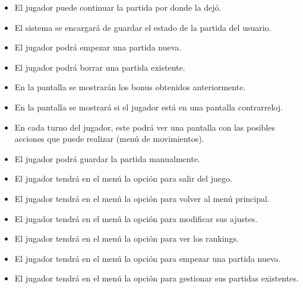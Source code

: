 \begin{itemize}
	\item El jugador puede continuar la partida por donde la dejó.
	\item El sistema se encargará de guardar el estado de la partida del usuario.
	\item El jugador podrá empezar una partida nueva.
	\item El jugador podrá borrar una partida existente.
	\item En la pantalla se mostrarán los bonus obtenidos anteriormente.
	\item En la pantalla se mostrará si el jugador está en una pantalla contrarreloj.
	\item En cada turno del jugador, este podrá ver una pantalla con las posibles acciones que puede realizar (menú de movimientos).
	\item El jugador podrá guardar la partida manualmente.
	\item El jugador tendrá en el menú la opción para salir del juego.
	\item El jugador tendrá en el menú la opción para volver al menú principal.
	\item El jugador tendrá en el menú la opción para modificar sus ajustes.
	\item El jugador tendrá en el menú la opción para ver los rankings.
	\item El jugador tendrá en el menú la opción para empezar una partida nueva.
	\item El jugador tendrá en el menú la opción para gestionar sus partidas existentes.
\end{itemize}
